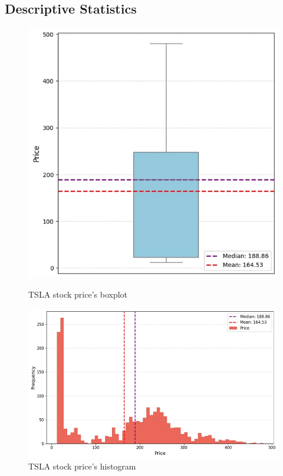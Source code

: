 \documentclass[12pt]{article}
\begin{document}
\subsection{Descriptive Statistics}
    

\begin{figure}[H]
    \centering
    \begin{minipage}[b]{0.48\linewidth}
        \centering
        \includegraphics[width=\linewidth]{boxplot.png}
        \caption{TSLA stock price’s boxplot}
        \label{fig:boxplot}
    \end{minipage}
    \hfill
    \begin{minipage}[b]{0.48\linewidth}
        \centering
        \includegraphics[width=\linewidth]{histogram.png}
        \caption{TSLA stock price’s histogram}
        \label{fig:histogram}
    \end{minipage}
\end{figure}
\end{document}
